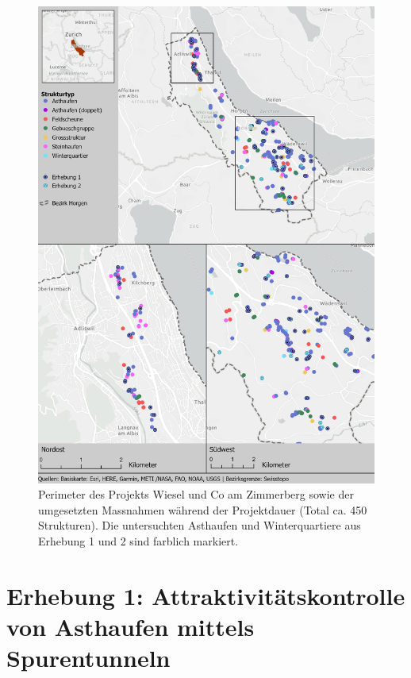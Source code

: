 \documentclass[
]{scrbook}
\begin{document}
\begin{figure}
\includegraphics[width=1\linewidth]{images/Layout_Strukturen} \caption{Perimeter des Projekts Wiesel und Co am Zimmerberg sowie der umgesetzten Massnahmen während der Projektdauer (Total ca. 450 Strukturen). Die untersuchten Asthaufen und Winterquartiere aus Erhebung 1 und 2 sind farblich markiert.}\label{fig:layoutstrukturen}
\end{figure}

\hypertarget{erhebung-1-attraktivituxe4tskontrolle-von-asthaufen-mittels-spurentunneln}{%
\section{Erhebung 1: Attraktivitätskontrolle von Asthaufen mittels Spurentunneln}\label{erhebung-1-attraktivituxe4tskontrolle-von-asthaufen-mittels-spurentunneln}}
\end{document}
